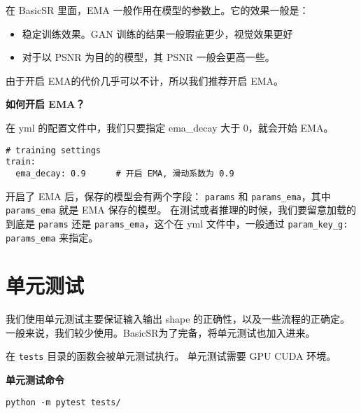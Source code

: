 \documentclass[../main.tex]{subfiles}
\begin{document}
在 BasicSR 里面，EMA 一般作用在模型的参数上。它的效果一般是：

\begin{itemize}
	\item 稳定训练效果。GAN 训练的结果一般瑕疵更少，视觉效果更好
	\item 对于以 PSNR 为目的的模型，其 PSNR 一般会更高一些。
\end{itemize}

由于开启 EMA的代价几乎可以不计，所以我们推荐开启 EMA。

\begin{hl} %
	\textbf{如何开启 EMA？}

	在 yml 的配置文件中，我们只要指定 ema\_decay 大于 0，就会开始 EMA。


\begin{verbatim}
# training settings
train:
  ema_decay: 0.9      # 开启 EMA, 滑动系数为 0.9
\end{verbatim}
\end{hl}

开启了 EMA 后，保存的模型会有两个字段： \texttt{params} 和 \texttt{params\_ema}，其中  \texttt{params\_ema} 就是 EMA 保存的模型。
在测试或者推理的时候，我们要留意加载的到底是 \texttt{params} 还是 \texttt{params\_ema}，这个在 yml 文件中，一般通过  \texttt{param\_key\_g: params\_ema} 来指定。


\section{单元测试}

我们使用单元测试主要保证输入输出 shape 的正确性，以及一些流程的正确定。
一般来说，我们较少使用。BasicSR为了完备，将单元测试也加入进来。

在 \texttt{tests} 目录的函数会被单元测试执行。
单元测试需要 GPU CUDA 环境。


\begin{hl} %
	\textbf{单元测试命令}


	\begin{verbatim}
python -m pytest tests/
	\end{verbatim}
\end{hl}
\end{document}
